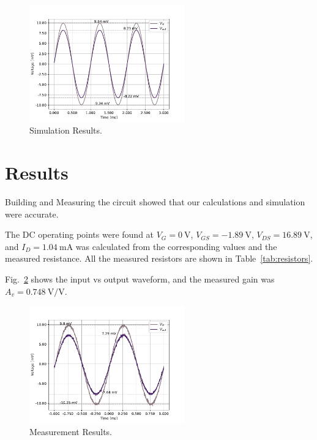 \documentclass{../../ece-report}
\begin{document}
\begin{figure}[h!]
  \centering
  \includegraphics[width=0.6\textwidth]{../plots/pdf/sim.pdf}
  \caption{Simulation Results.}\label{fig:sim}
\end{figure}

\section{Results}

Building and Measuring the circuit showed that our calculations
and simulation were accurate. 

The DC operating points were found at $V_G = 0~\si{\V}$,
$V_{GS} = -1.89~\si{\V}$, $V_{DS} = 16.89~\si{\V}$,
and $I_D = 1.04~\si{\mA}$ was calculated from the corresponding
values and the measured resistance. All the measured resistors are 
shown in Table~\ref{tab:resistors}.

Fig.~\ref{fig:meas} shows the input vs output waveform, and
the measured gain was $A_v = 0.748~\si{\V/\V}$.


\begin{figure}[h!]
  \centering
  \includegraphics[width=0.6\textwidth]{../plots/pdf/meas.pdf}
  \caption{Measurement Results.}\label{fig:meas}
\end{figure}
\end{document}
